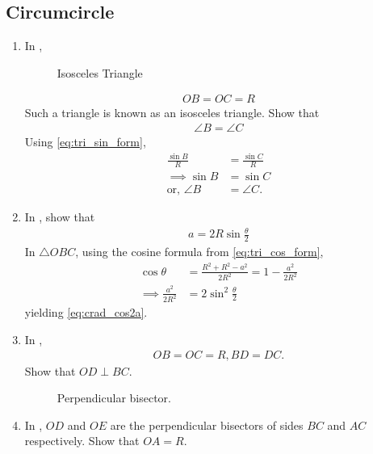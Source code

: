 \subsection{Circumcircle}
\begin{enumerate}[label=\thesubsection.\arabic*.,ref=\thesubsection.\theenumi]
\item In 
	,	
\begin{figure}[!ht]
	\begin{center}
		\resizebox{0.6\columnwidth}{!}{}
	\end{center}
	\caption{Isosceles Triangle}
	\label{fig:tri-isosc}	
\end{figure}
\begin{align}
	OB = OC=R
\end{align}
Such a triangle is known as an isosceles triangle.  Show that
\begin{align}
	\angle B = \angle C
\end{align}
\solution 
Using
\eqref{eq:tri_sin_form},
\begin{align}
	\frac{\sin B}{R} &= \frac{\sin C}{R}
	\\
\implies	{\sin B} &= {\sin C}
\\
	\text{or, } \angle B &= \angle C.
\end{align}
\item In 
	,	
	show that 
  \begin{align}
	  a = 2R \sin\frac{ \theta }{2}
\label{eq:crad_cos2a}
  \end{align}
		\solution In $\triangle OBC$,  using the cosine formula from
\eqref{eq:tri_cos_form},
\begin{align}
	\cos \theta &= \frac{R^2+R^2 - a^2}{2R^2} = 1 -\frac{a^2}{2R^2}
	\\
	\implies \frac{a^2}{2R^2}&= 2\sin^2\frac{\theta}{2}
\end{align}
yielding 
\eqref{eq:crad_cos2a}.

\item In 
	\label{prob:tri-ccentre-def}
	, 
\begin{align}
OB = OC=R, 	BD = DC.
\end{align}
Show that $OD \perp BC$.
%
\begin{figure}[!ht]
	\begin{center}
		
		\resizebox{0.6\columnwidth}{!}{}
	\end{center}
	\caption{Perpendicular bisector.}
	\label{fig:tri-perp-bis}	
\end{figure}
\item In 
	,
$OD$ and $OE$ are the perpendicular bisectors of sides $BC$ and $AC$ respectively.  Show that 
$OA = R$.
\begin{figure}[!ht]
	\begin{center}
		

\end{center}
\end{figure}
\end{enumerate}
